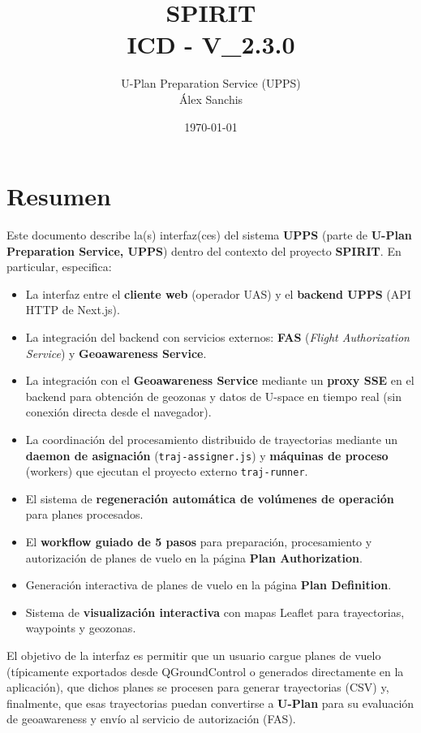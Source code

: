\documentclass[12pt,a4paper]{article}
\title{ SPIRIT \\ \small{ICD - V\_{2.3.0}}}
\author{U-Plan Preparation Service (UPPS) \\ Álex Sanchis}
\date{\today}
\begin{document}
\maketitle

\section*{Resumen}
Este documento describe la(s) interfaz(ces) del sistema \textbf{UPPS} (parte de \textbf{U-Plan Preparation Service, UPPS}) dentro del contexto del proyecto \textbf{SPIRIT}. En particular, especifica:
\begin{itemize}
    \item La interfaz entre el \textbf{cliente web} (operador UAS) y el \textbf{backend UPPS} (API HTTP de Next.js).
    \item La integración del backend con servicios externos: \textbf{FAS} (\textit{Flight Authorization Service}) y \textbf{Geoawareness Service}.
    \item La integración con el \textbf{Geoawareness Service} mediante un \textbf{proxy SSE} en el backend para obtención de geozonas y datos de U-space en tiempo real (sin conexión directa desde el navegador).
    \item La coordinación del procesamiento distribuido de trayectorias mediante un \textbf{daemon de asignación} (\texttt{traj-assigner.js}) y \textbf{máquinas de proceso} (workers) que ejecutan el proyecto externo \texttt{traj-runner}.
    \item El sistema de \textbf{regeneración automática de volúmenes de operación} para planes procesados.
    \item El \textbf{workflow guiado de 5 pasos} para preparación, procesamiento y autorización de planes de vuelo en la página \textbf{Plan Authorization}.
    \item Generación interactiva de planes de vuelo en la página \textbf{Plan Definition}.
    \item Sistema de \textbf{visualización interactiva} con mapas Leaflet para trayectorias, waypoints y geozonas.
\end{itemize}

El objetivo de la interfaz es permitir que un usuario cargue planes de vuelo (típicamente exportados desde QGroundControl o generados directamente en la aplicación), que dichos planes se procesen para generar trayectorias (CSV) y, finalmente, que esas trayectorias puedan convertirse a \textbf{U-Plan} para su evaluación de geoawareness y envío al servicio de autorización (FAS).
\end{document}
